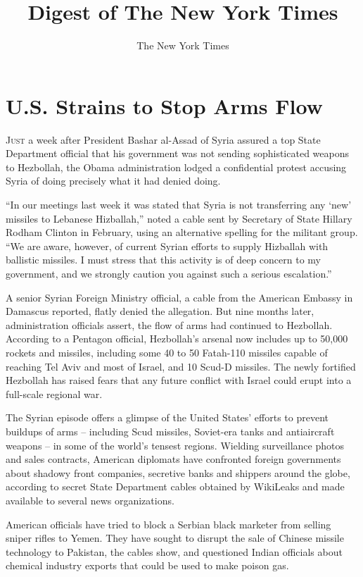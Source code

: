 ﻿\documentclass[12pt]{article}
\title{Digest of The New York Times}
\author{The New York Times}
\begin{document}
\date{}

\tableofcontents\thispagestyle{empty}

\clearpage
\setcounter{page}{1}

\section{U.S. Strains to Stop Arms Flow}

\lettrine{J}{ust} a week after President Bashar al-Assad of Syria assured a
top State Department official that his government was not sending sophisticated weapons to
Hezbollah, the Obama administration lodged a confidential protest accusing Syria of doing precisely
what it had denied doing.

``In our meetings last week it was stated that Syria is not transferring any `new' missiles to
Lebanese Hizballah,'' noted a cable sent by Secretary of State Hillary Rodham Clinton in February,
using an alternative spelling for the militant group. ``We are aware, however, of current Syrian
efforts to supply Hizballah with ballistic missiles. I must stress that this activity is of deep
concern to my government, and we strongly caution you against such a serious escalation.''

A senior Syrian Foreign Ministry official, a cable from the American Embassy in Damascus reported,
flatly denied the allegation. But nine months later, administration officials assert, the flow of
arms had continued to Hezbollah. According to a Pentagon official, Hezbollah's arsenal now includes
up to 50,000 rockets and missiles, including some 40 to 50 Fatah-110 missiles capable of reaching
Tel Aviv and most of Israel, and 10 Scud-D missiles. The newly fortified Hezbollah has raised fears
that any future conflict with Israel could erupt into a full-scale regional war.

The Syrian episode offers a glimpse of the United States' efforts to prevent buildups of arms --
including Scud missiles, Soviet-era tanks and antiaircraft weapons -- in some of the world's tensest
regions. Wielding surveillance photos and sales contracts, American diplomats have confronted
foreign governments about shadowy front companies, secretive banks and shippers around the globe,
according to secret State Department cables obtained by WikiLeaks and made available to several news
organizations.

American officials have tried to block a Serbian black marketer from selling sniper rifles to Yemen.
They have sought to disrupt the sale of Chinese missile technology to Pakistan, the cables show, and
questioned Indian officials about chemical industry exports that could be used to make poison gas.
\end{document}
